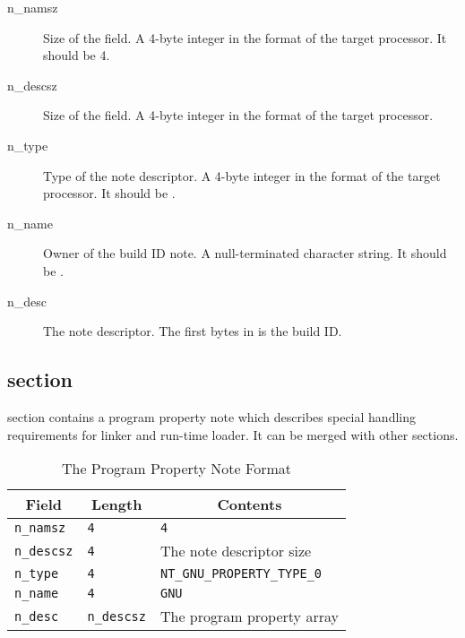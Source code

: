 \begin{description}
 \item[n_namsz] Size of the  field.  A 4-byte integer in the
   format of the target processor.  It should be 4.
 \item[n_descsz] Size of the  field.  A 4-byte integer in the
   format of the target processor.
 \item[n_type] Type of the note descriptor.  A 4-byte integer in the format
   of the target processor.  It should be .
 \item[n_name] Owner of the build ID note.  A null-terminated character
   string.  It should be .
 \item[n_desc] The note descriptor.  The first  bytes in
    is the build ID.
\end{description}

\subsection{ section}
\label{sec_property}

 section contains a program property note which
describes special handling requirements for linker and run-time loader.
It can be merged with other  sections.

\begin{table}[H]
\Hrule
 \caption{The Program Property Note Format}
 \label{format-property}
 \begin{center}
  \begin{tabular}[t]{l|l|l}
   \multicolumn{1}{c}{Field}
     & \multicolumn{1}{c}{Length}
       & \multicolumn{1}{c}{Contents} \\
   \hline
   \texttt{n_namsz} & \texttt{4} & \texttt{4} \\
   \texttt{n_descsz} & \texttt{4} & The note descriptor size \\
   \texttt{n_type} & \texttt{4} & \texttt{NT_GNU_PROPERTY_TYPE_0} \\
   \texttt{n_name} & \texttt{4} & \texttt{GNU} \\
   \texttt{n_desc} & \texttt{n_descsz} & The program property array \\
  \end{tabular}
 \end{center}
\Hrule
\end{table}

